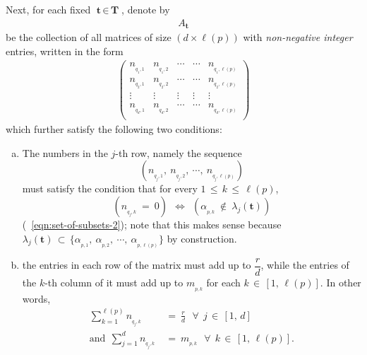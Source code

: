 \documentclass[10pt,reqno]{amsart}
\theoremstyle{myroman}
\numberwithin{equation}{section}
\begin{document}
	Next, for each fixed $\textbf{t}\,\in\, \textbf{T}$, denote by
	\begin{align}\label{eqn:collection-of-sequences}
		A_{\textbf{t}}
	\end{align}
	be the collection of all matrices of size $(d\times \ell(p))$ with \textit{non-negative integer} entries, written in the form
	\begin{align}\label{eqn:matrix}
		\begin{pmatrix}
			n_{_{q_1,1}} & n_{_{q_1,2}} & \cdots & \cdots& n_{_{q_1,\ell(p)}} \\
			n_{_{q_2,1}} & n_{_{q_2,2}} & \cdots & \cdots& n_{_{q_2,\ell(p)}} \\
			\vdots & \vdots & \vdots& \vdots &\vdots\\
			n_{_{q_d,1}} & n_{_{q_d,2}} & \cdots & \cdots& n_{_{q_d,\ell(p)}} \\
		\end{pmatrix}
	\end{align}
	which further satisfy the following two conditions:
	\begin{enumerate}[(a)]
		\item \label{condition-on-multiplicity-1} The numbers in the $j$-th row, namely the
		sequence 
		$$\left(n_{_{q_j,1}}, \ n_{_{q_j,2}},\ \cdots,\ n_{_{q_j,\ell(p)}}\right)$$
		must satisfy the condition that for every  $1\,\leq\, k\,\leq\,\ell(p)$,
		$$(n_{_{q_j,k}}\ =\ 0)\ \ \iff\ \ (\alpha_{_{p,k}}\ \notin\ \lambda_j(\textbf{t})) 
		$$ 
		(\ \eqref{eqn:set-of-subsets-2}); note that this makes sense because
		$\lambda_j(\textbf{t})\,\subset\,\{\alpha_{_{p,1}},\ \alpha_{_{p,2}},\ \cdots,\ \alpha_{_{p,\ell(p)}}\}$
		by construction.
		
		\item \label{condition-on-multiplicity-2} 
			the entries in each row of the matrix must add up to $\dfrac{r}{d}$, while the entries
			of the $k$-th column of it must add up to $m_{_{p,k}}$ for each $k\,\in\,[1,\,\ell(p)]$. In other words,
			\begin{align*}
				\sum_{k=1}^{\ell(p)} n_{_{q_j,k}} \ &= \ \frac{r}{d}\ \ \ \forall\ \ j\,\in\,[1,\,d]\\
				\text{and}\ \ \sum_{j=1}^{d} n_{_{q_j,k}} \ &= \ m_{_{p,k}}\ \ \ \forall\ \ k\,\in\,[1,\,\ell(p)].
			\end{align*}
		\end{enumerate}  
		
\end{document}
